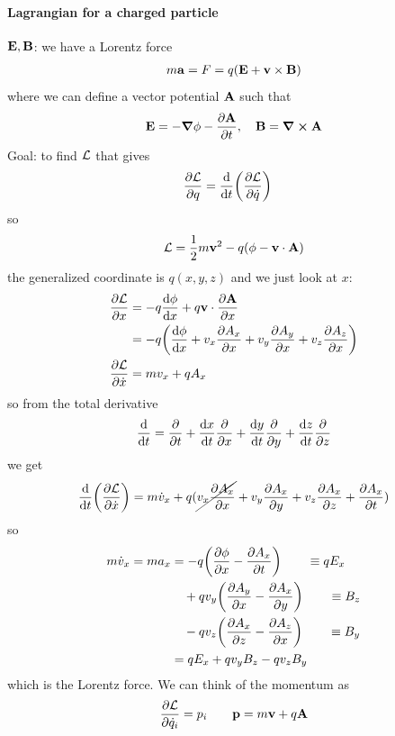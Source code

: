 \documentclass[../main.tex]{subfiles}
\begin{document}
\paragraph*{Lagrangian for a charged particle} $\vb E, \vb B$: we have a Lorentz force
\begin{align*}
    m\vb a = F  = q(\vb E + \vb v \times \vb B)
\end{align*}
where we can define a vector potential $\vb A$ such that
\begin{align*}
    \vb E = -\grad \phi - \pdv{\vb A}{t}, \quad \vb B = \curl \vb A
\end{align*}
Goal: to find $\mathcal{L}$ that gives
\begin{align*}
    \pdv{\mathcal{L}}{q} &= \dv{t}(\pdv{\mathcal{L}}{\dot q})
\end{align*}
so
\begin{align*}
    \mathcal{L} = \frac{1}{2} m \vb v^2 - q(\phi - \vb v \cdot \vb A)
\end{align*}
the generalized coordinate is $q(x, y, z)$ and we just look at $x$:
\begin{align*}
    \pdv{\lagr}{x} &= -q\dv{\phi}{x} + q \vb v \cdot \pdv{\vb A}{x} \\
       &= -q\qt(\dv{\phi}{x} + v_x \pdv{A_x}{x} + v_y \pdv{A_y}{x} + v_z \pdv{A_z}{x})  \\
    \pdv{\lagr}{\dot x} &= m v_x + q A_x
\end{align*}
so from the total derivative
\begin{align*}
    \dv{t} = \pdv{t} + \dv{x}{t} \pdv{x} + \dv{y}{t} \pdv{y} + \dv{z}{t} \pdv{z}
\end{align*}
we get
\begin{align*}
    \dv{t}(\pdv{\mathcal{L}}{\dot x}) &= m \dot v_x + q(\cancel{v_x \pdv{A_x}{x}} + v_y \pdv{A_x}{y} + v_z \pdv{A_x}{z} + \pdv{A_x}{t}) \\
\end{align*}
so 
\begin{align*}
    m \dot v_x = ma_x &= -q\qt(\pdv{\phi}{x} - \pdv{A_x}{t}) \qquad \equiv qE_x \\
    &\quad + qv_y \qt(\pdv{A_y}{x} - \pdv{A_x}{y}) \qquad \equiv B_z \\
    &\quad - qv_z \qt(\pdv{A_x}{z} - \pdv{A_z}{x}) \qquad \equiv B_y \\
    &= qE_x + qv_y B_z - qv_z B_y
\end{align*}
which is the Lorentz force. We can think of the momentum as
\begin{align*}
    \pdv{\mathcal{L}}{\dot q_i} = p_i \qquad \vb p = m \vb v + q \vb A
\end{align*}
\end{document}
